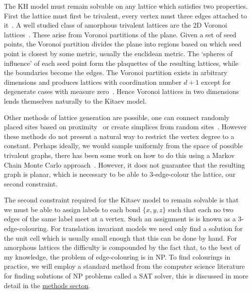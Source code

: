 The KH model must remain solvable on any lattice which satisfies two properties. First the lattice must first be trivalent, every vertex must three edges attached to it~\autocite{kitaevAnyonsExactlySolved2006,Nussinov2009}. A well studied class of amorphous trivalent lattices are the 2D Voronoi lattices~\autocite{mitchellAmorphousTopologicalInsulators2018,florescu_designer_2009,marsalTopologicalWeaireThorpeModels2020}. These arise from Voronoi partitions of the plane. Given a set of seed points, the Voronoi partition divides the plane into regions based on which seed point is closest by some metric, usually the euclidean metric. The `spheres of influence' of each seed point form the plaquettes of the resulting lattices, while the boundaries become the edges. The Voronoi partition exists in arbitrary dimensions and produces lattices with coordination number \(d+1\) except for degenerate cases with measure zero~\autocite{voronoiNouvellesApplicationsParamètres1908,watsonComputingNdimensionalDelaunay1981}. Hence Voronoi lattices in two dimensions lends themselves naturally to the Kitaev model.

Other methods of lattice generation are possible, one can connect randomly placed sites based on proximity~\autocite{agarwala2019topological} or create simplices from random sites~\autocite{christRandomLatticeField1982}. However these methods do not present a natural way to restrict the vertex degree to a constant. Perhaps ideally, we would sample uniformly from the space of possible trivalent graphs, there has been some work on how to do this using a Markov Chain Monte Carlo approach~\autocite{alyamiUniformSamplingDirected2016}. However, it does not guarantee that the resulting graph is planar, which is necessary to be able to 3-edge-colour the lattice, our second constraint.

The second constraint required for the Kitaev model to remain solvable is that we must be able to assign labels to each bond \(\{x,y,z\}\) such that each no two edges of the same label meet at a vertex. Such an assignment is is known as a 3-edge-colouring. For translation invariant models we need only find a solution for the unit cell which is usually small enough that this can be done by hand. For amorphous lattices the difficulty is compounded by the fact that, to the best of my knowledge, the problem of edge-colouring is in NP. To find colourings in practice, we will employ a standard method from the computer science literature for finding solutions of NP problems called a SAT solver, this is discussed in more detail in the \protect\hyperlink{amk-methods}{methods secton}.

